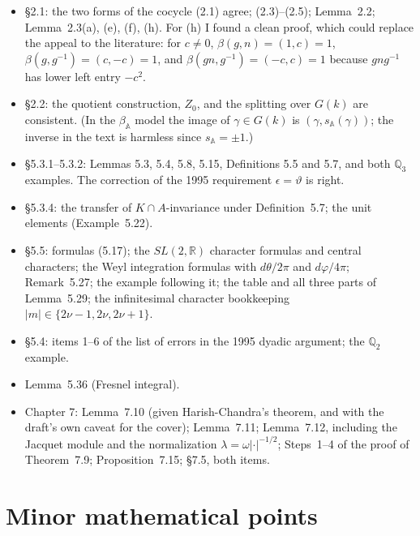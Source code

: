 \documentclass[12pt,letterpaper]{article}
\newcommand{\A}{\mathbb{A}}
\newcommand{\R}{\mathbb{R}}
\newcommand{\Q}{\mathbb{Q}}
\theoremstyle{plain}
\begin{document}
\begin{itemize}
\item \S2.1: the two forms of the cocycle (2.1) agree; (2.3)--(2.5);
Lemma~2.2; Lemma~2.3(a), (e), (f), (h). For (h) I found a clean proof,
which could replace the appeal to the literature: for $c\neq0$,
$\beta(g,n)=(1,c)=1$, $\beta(g,g^{-1})=(c,-c)=1$, and
$\beta(gn,g^{-1})=(-c,c)=1$ because $gng^{-1}$ has lower left entry
$-c^2$.
\item \S2.2: the quotient construction, $Z_0$, and the splitting over
$G(k)$ are consistent. (In the $\beta_{\A}$ model the image of
$\gamma\in G(k)$ is $(\gamma,s_{\A}(\gamma))$; the inverse in the text is
harmless since $s_{\A}=\pm1$.)
\item \S5.3.1--5.3.2: Lemmas 5.3, 5.4, 5.8, 5.15, Definitions 5.5 and 5.7, and both
$\Q_3$ examples. The correction of the 1995 requirement
$\epsilon=\vartheta$ is right.
\item \S5.3.4: the transfer of $K\cap A$-invariance under Definition~5.7; the
unit elements (Example~5.22).
\item \S5.5: formulas (5.17); the $SL(2,\R)$ character formulas and central
characters; the Weyl integration formulas with $d\theta/2\pi$ and
$d\varphi/4\pi$; Remark~5.27; the example following it; the table and all
three parts of Lemma~5.29; the infinitesimal character bookkeeping
$|m|\in\{2\nu-1,2\nu,2\nu+1\}$.
\item \S5.4: items 1--6 of the list of errors in the 1995 dyadic argument;
the $\Q_2$ example.
\item Lemma~5.36 (Fresnel integral).
\item Chapter 7: Lemma~7.10 (given Harish-Chandra's theorem, and with the
draft's own caveat for the cover); Lemma~7.11; Lemma~7.12, including the
Jacquet module and the normalization $\lambda=\omega|\cdot|^{-1/2}$;
Steps~1--4 of the proof of Theorem~7.9; Proposition~7.15;
\S7.5, both items.
\end{itemize}

\section{Minor mathematical points}
\end{document}
